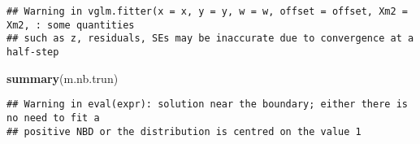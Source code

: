 \documentclass[
]{book}
\newenvironment{Shaded}{\begin{snugshade}}{\end{snugshade}}
\newcommand{\KeywordTok}[1]{\textcolor[rgb]{0.13,0.29,0.53}{\textbf{#1}}}
\newcommand{\NormalTok}[1]{#1}
\begin{document}
\begin{verbatim}
## Warning in vglm.fitter(x = x, y = y, w = w, offset = offset, Xm2 = Xm2, : some quantities
## such as z, residuals, SEs may be inaccurate due to convergence at a half-step
\end{verbatim}

\begin{Shaded}
\begin{Highlighting}[]
\KeywordTok{summary}\NormalTok{(m.nb.trun)}
\end{Highlighting}
\end{Shaded}

\begin{verbatim}
## Warning in eval(expr): solution near the boundary; either there is no need to fit a
## positive NBD or the distribution is centred on the value 1
\end{verbatim}
\end{document}
